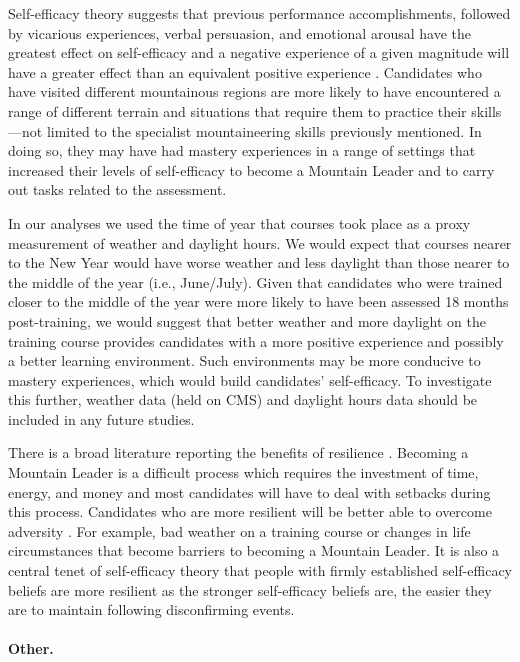 \documentclass[
  12pt,
  a4paper,
]{book}
\begin{document}
Self-efficacy theory suggests that previous performance accomplishments, followed by vicarious experiences, verbal persuasion, and emotional arousal have the greatest effect on self-efficacy and a negative experience of a given magnitude will have a greater effect than an equivalent positive experience \citep{Bandura1977, Bandura1982}. Candidates who have visited different mountainous regions are more likely to have encountered a range of different terrain and situations that require them to practice their skills---not limited to the specialist mountaineering skills previously mentioned. In doing so, they may have had mastery experiences in a range of settings that increased their levels of self-efficacy to become a Mountain Leader and to carry out tasks related to the assessment.

In our analyses we used the time of year that courses took place as a proxy measurement of weather and daylight hours. We would expect that courses nearer to the New Year would have worse weather and less daylight than those nearer to the middle of the year (i.e., June/July). Given that candidates who were trained closer to the middle of the year were more likely to have been assessed 18 months post-training, we would suggest that better weather and more daylight on the training course provides candidates with a more positive experience and possibly a better learning environment. Such environments may be more conducive to mastery experiences, which would build candidates' self-efficacy. To investigate this further, weather data (held on CMS) and daylight hours data should be included in any future studies.

There is a broad literature reporting the benefits of resilience \citep[e.g.,][]{Seery2016, Smith2008}. Becoming a Mountain Leader is a difficult process which requires the investment of time, energy, and money and most candidates will have to deal with setbacks during this process. Candidates who are more resilient will be better able to overcome adversity \citep{Smith2008}. For example, bad weather on a training course or changes in life circumstances that become barriers to becoming a Mountain Leader. It is also a central tenet of self-efficacy theory that people with firmly established self-efficacy beliefs are more resilient \citep{Bandura1997} as the stronger self-efficacy beliefs are, the easier they are to maintain following disconfirming events.

\hypertarget{other.}{%
\paragraph{Other.}\label{other.}}
\end{document}
